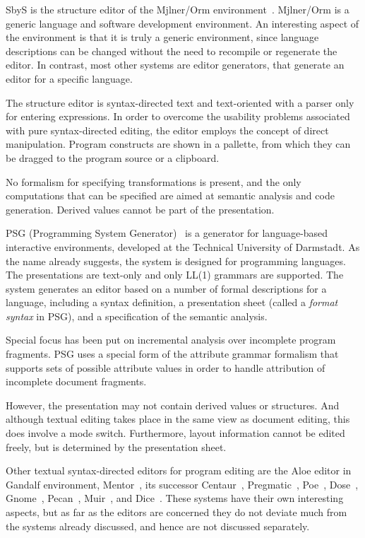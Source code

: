 
SbyS is the structure editor of the Mj\slasho lner/Orm environment~\cite{magnusson90orm}. Mj\slasho lner/Orm is a generic language and software development environment. An interesting aspect of the environment is that it is truly a generic environment, since language descriptions can be changed without the need to recompile or regenerate the editor. In contrast, most other systems are editor generators, that generate an editor for a specific language.

The structure editor is syntax-directed text and text-oriented with a parser only for entering expressions. In order to overcome the usability problems associated with pure syntax-directed editing, the editor employs the concept of direct manipulation. Program constructs are shown in a pallette, from which they can be dragged to the program source or a clipboard.

No formalism for specifying transformations is present, and the only computations that can be specified are aimed at semantic analysis and code generation. Derived values cannot be part of the presentation.



PSG (Programming System Generator)~\cite{Bahlke86PSG} is a generator for language-based interactive environments, developed at the Technical University of Darmstadt. As the name already suggests, the system is designed for programming languages. The presentations are text-only and only LL(1) grammars are supported. The system generates an editor based on a number of formal descriptions for a language, including a syntax definition, a presentation sheet (called a {\em format syntax} in PSG), and a specification of the semantic analysis.

Special focus has been put on incremental analysis over incomplete program fragments. PSG uses a special form of the attribute grammar formalism that supports sets of possible attribute values in order to handle attribution of incomplete document fragments.

However, the presentation may not contain derived values or structures. And although textual editing takes place in the same view as document editing, this does involve a mode switch. Furthermore, layout information cannot be edited freely, but is determined by the presentation sheet.


Other textual syntax-directed editors for program editing are the Aloe editor in Gandalf environment\cite{notkin85gandalf}, Mentor~\cite{donzeau84mentor}, its successor Centaur~\cite{borras88centaur}, Pregmatic~\cite{brand92pregmatic}, Poe~\cite{fischer84poe}, Dose~\cite{kaiser88dose}, Gnome~\cite{garlan84gnome}, Pecan~\cite{reiss84pecan}, Muir~\cite{normark88muir}, and Dice~\cite{fritzson84dice}. These systems have their own interesting aspects, but as far as the editors are concerned they do not deviate much from the systems already discussed, and hence are not discussed separately.


